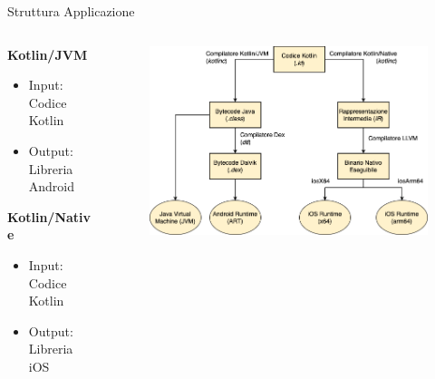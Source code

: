 \begin{frame}{Struttura Applicazione}
    \begin{columns}[onlytextwidth,t]
        \begin{column}{0.4\textwidth}

            \textbf{Kotlin/JVM}
            \begin{itemize}
                \item Input: Codice Kotlin
                \item Output: Libreria Android
            \end{itemize}

            \vspace{4mm}

            \textbf{Kotlin/Native}
            \begin{itemize}
                \item Input: Codice Kotlin
                \item Output: Libreria iOS
            \end{itemize}            
            
        \end{column}
        \begin{column}{0.6\textwidth}
        
             \begin{figure}[H]
                \includegraphics[width=1\textwidth]{img/compilatore_kotlin.png}
            \end{figure}
            
        \end{column}
    \end{columns}
\end{frame}

